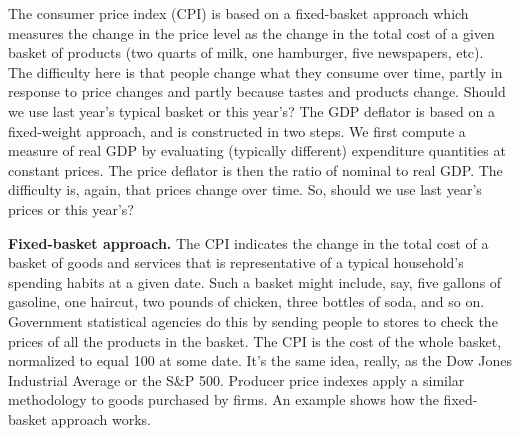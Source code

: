 The consumer price index 
 (CPI) is
based on a fixed-basket approach  which measures the change in the
price level as the change in the total cost of a given basket of
products (two quarts of milk, one hamburger, five newspapers,
etc). The difficulty here is that people change what they consume
over time, partly in response to price changes and partly because
tastes and products change. Should we use last year's typical
basket or this year's? The GDP deflator is based on a
fixed-weight approach, and is constructed in two steps. We first
compute a measure of real GDP by evaluating (typically
different) expenditure quantities at constant prices. The price
deflator is then the ratio of nominal to real GDP. The
difficulty is, again, that prices change over time. So, should we use
last year's prices or this year's?

\textbf{Fixed-basket approach.} The CPI indicates the change in
the total cost of a basket of goods and services that is
representative of a typical household's spending habits at a given
date. Such a basket might include, say, five gallons of gasoline,
one haircut, two pounds of chicken, three bottles of soda, and so
on. Government statistical agencies do this by sending people to
stores to check the prices of all the products in the basket. The
CPI is the cost of the whole basket, normalized to equal 100 at
some date. It's the same idea, really, as the Dow Jones Industrial
Average or the S\&P 500. Producer price indexes apply a similar
methodology to goods purchased by firms.  An example shows how the
fixed-basket approach  works.

